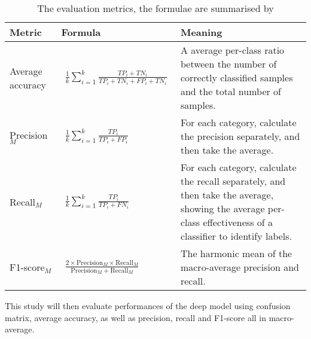 \begin{table}[!htbp]
\renewcommand{\arraystretch}{1.8}
\centering
\begin{tabularx}{\textwidth}{p{.12\linewidth}|>{\centering\arraybackslash}m{.3\linewidth}X}
\hline
Metric & Formula & Meaning \\
\hline
Average accuracy & \vspace{1em}$\begin{aligned}\frac{1}{k}\sum_{i=1}^{k} \frac{TP_{i}+TN_{i}}{TP_{i}+TN_{i}+FP_{i}+TN_{i}}\end{aligned}$ & A average per-class ratio between the number of correctly classified samples and the total number of samples. \\
Precision$_M$ & $\begin{aligned}\frac{1}{k}\sum_{i=1}^{k} \frac{TP_{i}}{TP_{i}+FP_{i}}\end{aligned}$ & For each category, calculate the precision separately, and then take the average. \\
Recall$_M$ & $\begin{aligned}\frac{1}{k}\sum_{i=1}^{k} \frac{TP_{i}}{TP_{i}+FN_{i}}\end{aligned}$ & For each category, calculate the recall separately, and then take the average, showing the average per-class effectiveness of a classifier to identify labels. \\
F1-score$_M$ & $\begin{aligned}\frac{2 \times \text{Precision}_{M} \times \text{Recall}_{M}}{\text {Precision}_{M}+\text{Recall}_{M}}\end{aligned}$ & The harmonic mean of the macro-average precision and recall. \\
\hline
\end{tabularx}
\caption{The evaluation metrics, the formulae are summarised by \citet{foss2018multiclass}}
\label{tab:The evaluation metrics}
\end{table}

This study will then evaluate performances of the deep model using confusion matrix, average accuracy, as well as precision, recall and F1-score all in macro-average.
